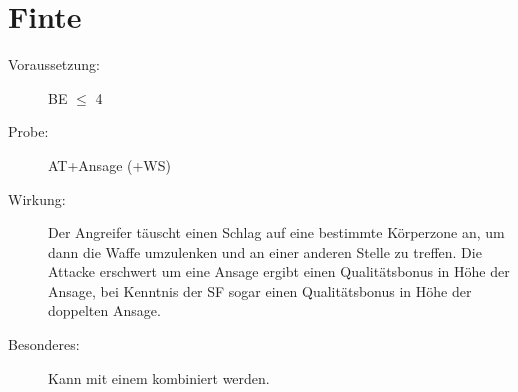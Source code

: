 \section{Finte}
\label{bAT.finte}
\begin{description}
    \item[Voraussetzung:]
        BE\textrm{ ${\leq}$ }4
    \item[Probe:]
        AT+Ansage (+WS)
    \item[Wirkung:]
        Der Angreifer täuscht einen Schlag auf eine bestimmte Körperzone an, um dann die Waffe umzulenken und an einer anderen Stelle zu treffen.
        Die Attacke erschwert um eine Ansage ergibt einen Qualitätsbonus in Höhe der Ansage, bei Kenntnis der SF  sogar einen Qualitätsbonus in Höhe der doppelten Ansage.
    \item[Besonderes:]
        Kann mit einem  kombiniert werden.
\end{description}
